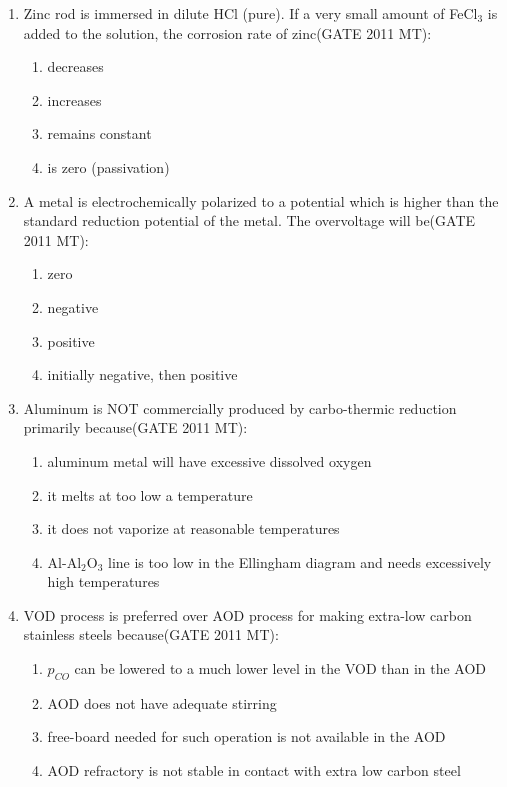 \documentclass[12pt]{article}
\begin{document}
\begin{enumerate}
\item Zinc rod is immersed in dilute HCl (pure). If a very small amount of FeCl$_3$ is added to the solution, the corrosion rate of zinc(GATE 2011 MT):
    \begin{enumerate}
        \item decreases
        \item increases
        \item remains constant
        \item is zero (passivation)
    \end{enumerate}

\item A metal is electrochemically polarized to a potential which is higher than the standard reduction potential of the metal. The overvoltage will be(GATE 2011 MT):
    \begin{enumerate}
        \item zero
        \item negative
        \item positive
        \item initially negative, then positive
    \end{enumerate}

\item Aluminum is NOT commercially produced by carbo-thermic reduction primarily because(GATE 2011 MT):
    \begin{enumerate}
        \item aluminum metal will have excessive dissolved oxygen
        \item it melts at too low a temperature
        \item it does not vaporize at reasonable temperatures
        \item Al-Al$_2$O$_3$ line is too low in the Ellingham diagram and needs excessively high temperatures
    \end{enumerate}

\item VOD process is preferred over AOD process for making extra-low carbon stainless steels because(GATE 2011 MT):
    \begin{enumerate}
        \item $p_{CO}$ can be lowered to a much lower level in the VOD than in the AOD
        \item AOD does not have adequate stirring
        \item free-board needed for such operation is not available in the AOD
        \item AOD refractory is not stable in contact with extra low carbon steel
    \end{enumerate}


\end{enumerate}
\end{document}

